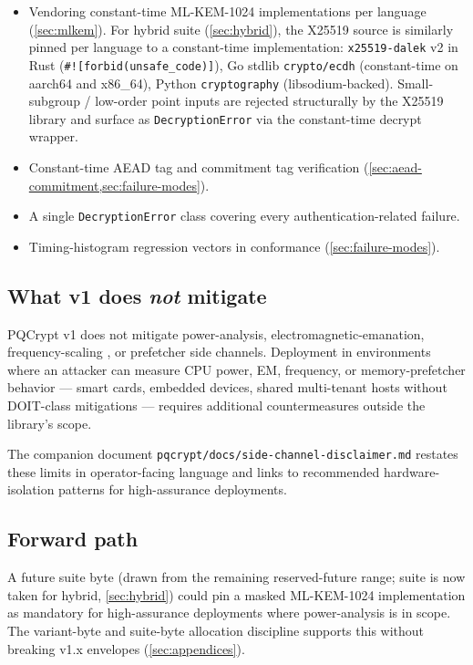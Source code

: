 \begin{itemize}
\item Vendoring constant-time ML-KEM-1024 implementations per language (\cref{sec:mlkem}). For hybrid suite  (\cref{sec:hybrid}), the X25519 source is similarly pinned per language to a constant-time implementation: \texttt{x25519-dalek} v2 in Rust (\texttt{\#![forbid(unsafe\_code)]}), Go stdlib \texttt{crypto/ecdh} (constant-time on aarch64 and x86\_64), Python \texttt{cryptography} (libsodium-backed). Small-subgroup / low-order point inputs are rejected structurally by the X25519 library and surface as \texttt{DecryptionError} via the constant-time decrypt wrapper.
\item Constant-time AEAD tag and commitment tag verification (\cref{sec:aead-commitment,sec:failure-modes}).
\item A single \texttt{DecryptionError} class covering every authentication-related failure.
\item Timing-histogram regression vectors in conformance (\cref{sec:failure-modes}).
\end{itemize}

\subsection{What v1 does \emph{not} mitigate}

\begin{calloutwarning}
PQCrypt v1 does not mitigate power-analysis, electromagnetic-emanation, frequency-scaling \citep{hertzbleed,gofetch}, or prefetcher \citep{gofetch} side channels. Deployment in environments where an attacker can measure CPU power, EM, frequency, or memory-prefetcher behavior --- smart cards, embedded devices, shared multi-tenant hosts without DOIT-class mitigations \citep{intel-doit} --- requires additional countermeasures outside the library's scope.
\end{calloutwarning}

The companion document \texttt{pqcrypt/docs/side-channel-disclaimer.md} restates these limits in operator-facing language and links to recommended hardware-isolation patterns for high-assurance deployments.

\subsection{Forward path}

A future suite byte (drawn from the remaining reserved-future range; suite  is now taken for hybrid, \cref{sec:hybrid}) could pin a masked ML-KEM-1024 implementation as mandatory for high-assurance deployments where power-analysis is in scope. The variant-byte and suite-byte allocation discipline supports this without breaking v1.x envelopes (\cref{sec:appendices}).
